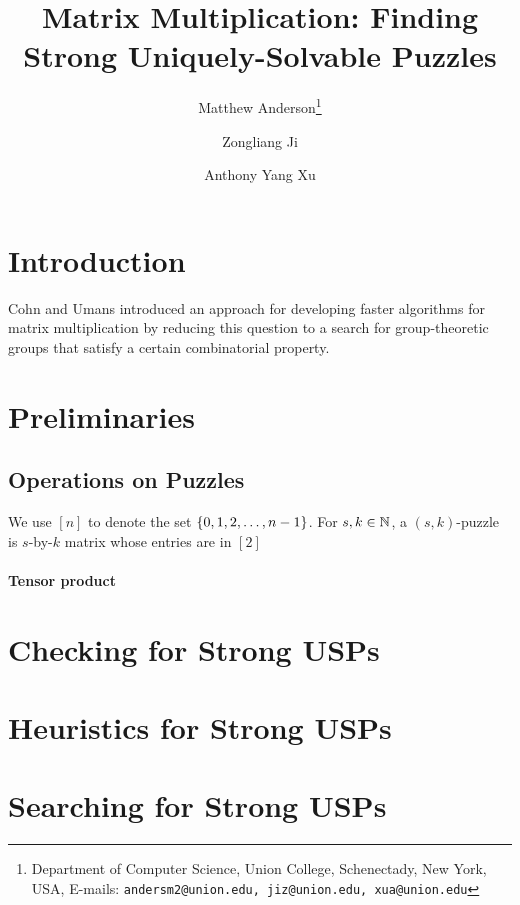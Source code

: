 \documentclass[11pt]{article}
\date{}
\title{Matrix Multiplication: Finding Strong Uniquely-Solvable Puzzles
{\IfFileExists{./sha.tex}{\\\small SHA: }{}}}
\author{
Matthew Anderson\thanks{Department of Computer Science, Union College, Schenectady, New York, USA, E-mails: \texttt{andersm2@union.edu, jiz@union.edu, xua@union.edu}}%
\and%
Zongliang Ji\samethanks[1]
\and%
Anthony Yang Xu\samethanks[1]
}
\begin{document}
\maketitle

\begin{abstract}

\end{abstract}

\thispagestyle{empty}
\newpage
{}


\section{Introduction}
\label{sec:intro}

Cohn and Umans \cite{cu03} introduced an approach for developing
faster algorithms for matrix multiplication by reducing this question
to a search for group-theoretic groups that satisfy a certain
combinatorial property.

\section{Preliminaries}
\label{sec:prelim}

\subsection{Operations on Puzzles}
\label{subsec:ops}

We use $[n]$ to denote the set $\left\{ 0,1,2,\ldots, n-1 \right\}$.  For $s, k
\in \mathbb{N}$, a $(s,k)$-puzzle is $s$-by-$k$ matrix whose entries are
in $[2]$

\paragraph{Tensor product}


\section{Checking for Strong USPs}
\label{sec:check}

\section{Heuristics for Strong USPs}
\label{sec:heuristic}

\section{Searching for Strong USPs}
\label{sec:search}
\end{document}
